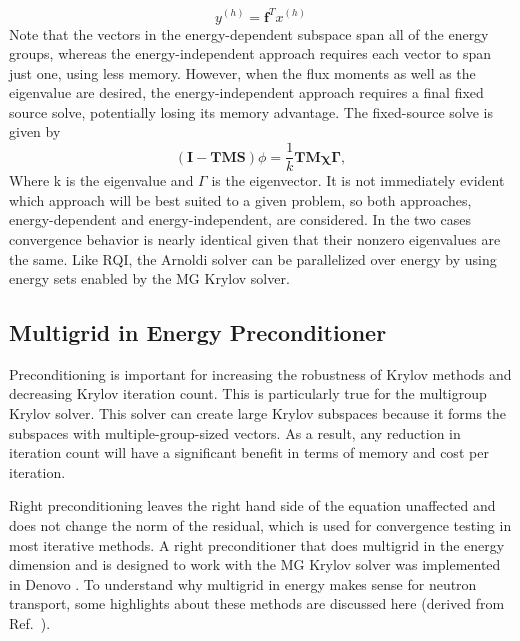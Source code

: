 \documentclass[preprint,12pt]{elsarticle}
\begin{document}
\begin{equation}
y^{(h)} = \mathbf{f}^Tx^{(h)}
\end{equation}
Note that the vectors in the energy-dependent subspace span all of the energy groups, whereas the energy-independent approach requires each vector to span just one, using less memory. However, when the flux moments as well as the eigenvalue are desired, the energy-independent approach requires a final fixed source solve, potentially losing its memory advantage. The fixed-source solve is given by
\begin{equation}
(\mathbf{I} - \mathbf{TMS})\phi = \frac{1}{k}\mathbf{TM\chi\Gamma},
\end{equation}
Where k is the eigenvalue and $\Gamma$ is the eigenvector. It is not immediately evident which approach will be best suited to a given problem, so both approaches, energy-dependent and energy-independent, are considered. In the two cases convergence behavior is nearly identical given that their nonzero eigenvalues are the same. Like RQI, the Arnoldi solver can be parallelized over energy by using energy sets enabled by the MG Krylov solver.


\subsection{Multigrid in Energy Preconditioner}
\label{sec:precond}
Preconditioning is important for increasing the robustness of Krylov methods and decreasing Krylov iteration count. This is particularly true for the multigroup Krylov solver. This solver can create large Krylov subspaces because it forms the subspaces with multiple-group-sized vectors. As a result, any reduction in iteration count will have a significant benefit in terms of memory and cost per iteration. 
 
Right preconditioning leaves the right hand side of the equation unaffected and does not change the norm of the residual, which is used for convergence testing in most iterative methods. A right preconditioner that does multigrid in the energy dimension and is designed to work with the MG Krylov solver was implemented in Denovo \cite{Slaybaugh2013}. To understand why multigrid in energy makes sense for neutron transport, some highlights about these methods are discussed here (derived from Ref.\ \cite{Briggs2000}). 
\end{document}
